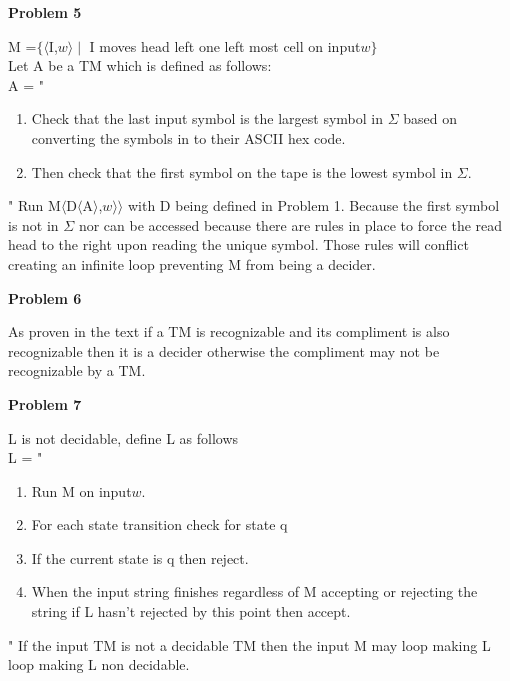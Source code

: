 \documentclass[letterpaper,12pt]{article}
\makeatletter
\newcommand\exercise[1]{\par\vspace{4ex}\normalfont\normalsize\noindent
\textbf{\large Problem #1}\par\nobreak\@afterindentfalse\@afterheading}
\makeatother
\begin{document}
\exercise{5}
M =$\{\langle$I,$w\rangle\mid$ I moves head left one left most cell on input$w\}$\\
Let A be a TM which is defined as follows:\\
A = "
\begin{enumerate}
\item Check that the last input symbol is the largest symbol in $\Sigma$ based on converting the symbols in to their ASCII hex code.
\item Then check that the first symbol on the tape is the lowest symbol in $\Sigma$.
\end{enumerate}
"
Run M$\langle$D$\langle$A$\rangle$,$w\rangle\rangle$ with D being defined in Problem 1. Because the first symbol is not in $\Sigma$ nor can be accessed because there are rules in place to force the read head to the right upon reading the unique symbol. Those rules will conflict creating an infinite loop preventing M from being a decider.

\exercise{6}
As proven in the text if a TM is recognizable and its compliment is also recognizable then it is a decider otherwise the compliment may not be recognizable by a TM.

\exercise{7}
L is not decidable, define L as follows\\
L = "
\begin{enumerate}
\item Run M on input$w$.
\item For each state transition check for state q
\item 	If the current state is q then reject.
\item When the input string finishes regardless of M accepting or rejecting the string if L hasn't rejected by this point then accept.
\end{enumerate}
"
If the input TM is not a decidable TM then the input M may loop making L loop making L non decidable.
\end{document}
